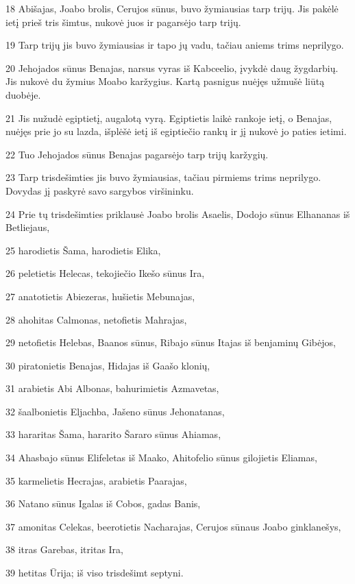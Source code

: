\par 18 Abišajas, Joabo brolis, Cerujos sūnus, buvo žymiausias tarp trijų. Jis pakėlė ietį prieš tris šimtus, nukovė juos ir pagarsėjo tarp trijų. 
\par 19 Tarp trijų jis buvo žymiausias ir tapo jų vadu, tačiau aniems trims neprilygo. 
\par 20 Jehojados sūnus Benajas, narsus vyras iš Kabceelio, įvykdė daug žygdarbių. Jis nukovė du žymius Moabo karžygius. Kartą pasnigus nuėjęs užmušė liūtą duobėje. 
\par 21 Jis nužudė egiptietį, augalotą vyrą. Egiptietis laikė rankoje ietį, o Benajas, nuėjęs prie jo su lazda, išplėšė ietį iš egiptiečio rankų ir jį nukovė jo paties ietimi. 
\par 22 Tuo Jehojados sūnus Benajas pagarsėjo tarp trijų karžygių. 
\par 23 Tarp trisdešimties jis buvo žymiausias, tačiau pirmiems trims neprilygo. Dovydas jį paskyrė savo sargybos viršininku. 
\par 24 Prie tų trisdešimties priklausė Joabo brolis Asaelis, Dodojo sūnus Elhananas iš Betliejaus, 
\par 25 harodietis Šama, harodietis Elika, 
\par 26 peletietis Helecas, tekojiečio Ikešo sūnus Ira, 
\par 27 anatotietis Abiezeras, hušietis Mebunajas, 
\par 28 ahohitas Calmonas, netofietis Mahrajas, 
\par 29 netofietis Helebas, Baanos sūnus, Ribajo sūnus Itajas iš benjaminų Gibėjos, 
\par 30 piratonietis Benajas, Hidajas iš Gaašo klonių, 
\par 31 arabietis Abi Albonas, bahurimietis Azmavetas, 
\par 32 šaalbonietis Eljachba, Jašeno sūnus Jehonatanas, 
\par 33 hararitas Šama, hararito Šararo sūnus Ahiamas, 
\par 34 Ahasbajo sūnus Elifeletas iš Maako, Ahitofelio sūnus gilojietis Eliamas, 
\par 35 karmelietis Hecrajas, arabietis Paarajas, 
\par 36 Natano sūnus Igalas iš Cobos, gadas Banis, 
\par 37 amonitas Celekas, beerotietis Nacharajas, Cerujos sūnaus Joabo ginklanešys, 
\par 38 itras Garebas, itritas Ira, 
\par 39 hetitas Ūrija; iš viso trisdešimt septyni.



